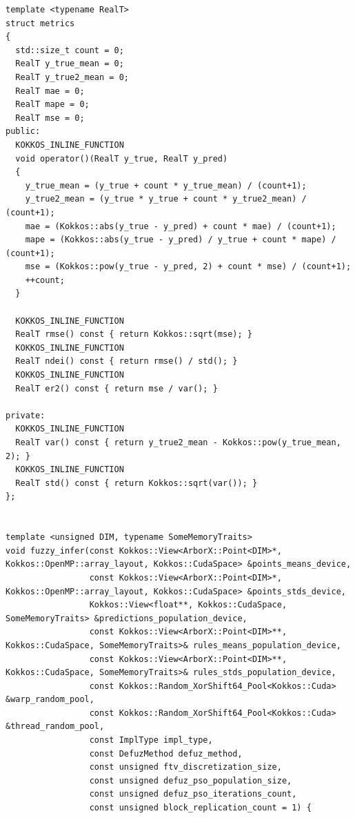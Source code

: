 \endgroup
\begingroup
\captiondelim{ } %
\begin{ListingEnv}
\label{lst:cuda}
\end{ListingEnv}
\begin{verbatim}
template <typename RealT>
struct metrics
{
  std::size_t count = 0;
  RealT y_true_mean = 0;
  RealT y_true2_mean = 0;
  RealT mae = 0;
  RealT mape = 0;
  RealT mse = 0;
public:
  KOKKOS_INLINE_FUNCTION
  void operator()(RealT y_true, RealT y_pred)
  {
    y_true_mean = (y_true + count * y_true_mean) / (count+1);
    y_true2_mean = (y_true * y_true + count * y_true2_mean) / (count+1);
    mae = (Kokkos::abs(y_true - y_pred) + count * mae) / (count+1);
    mape = (Kokkos::abs(y_true - y_pred) / y_true + count * mape) / (count+1);
    mse = (Kokkos::pow(y_true - y_pred, 2) + count * mse) / (count+1);
    ++count;
  }

  KOKKOS_INLINE_FUNCTION
  RealT rmse() const { return Kokkos::sqrt(mse); }
  KOKKOS_INLINE_FUNCTION
  RealT ndei() const { return rmse() / std(); }
  KOKKOS_INLINE_FUNCTION
  RealT er2() const { return mse / var(); }

private:
  KOKKOS_INLINE_FUNCTION
  RealT var() const { return y_true2_mean - Kokkos::pow(y_true_mean, 2); }
  KOKKOS_INLINE_FUNCTION
  RealT std() const { return Kokkos::sqrt(var()); }
};


template <unsigned DIM, typename SomeMemoryTraits>
void fuzzy_infer(const Kokkos::View<ArborX::Point<DIM>*, Kokkos::OpenMP::array_layout, Kokkos::CudaSpace> &points_means_device,
                 const Kokkos::View<ArborX::Point<DIM>*, Kokkos::OpenMP::array_layout, Kokkos::CudaSpace> &points_stds_device,
                 Kokkos::View<float**, Kokkos::CudaSpace, SomeMemoryTraits> &predictions_population_device,
                 const Kokkos::View<ArborX::Point<DIM>**, Kokkos::CudaSpace, SomeMemoryTraits>& rules_means_population_device,
                 const Kokkos::View<ArborX::Point<DIM>**, Kokkos::CudaSpace, SomeMemoryTraits>& rules_stds_population_device,
                 const Kokkos::Random_XorShift64_Pool<Kokkos::Cuda> &warp_random_pool,
                 const Kokkos::Random_XorShift64_Pool<Kokkos::Cuda> &thread_random_pool,
                 const ImplType impl_type,
                 const DefuzMethod defuz_method,
                 const unsigned ftv_discretization_size,
                 const unsigned defuz_pso_population_size,
                 const unsigned defuz_pso_iterations_count,
                 const unsigned block_replication_count = 1) {


\end{verbatim}
